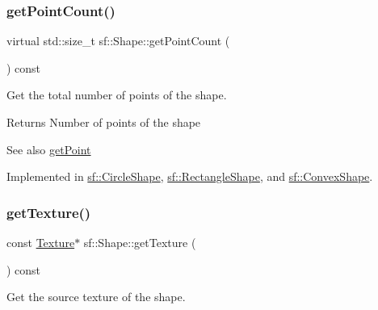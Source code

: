 \mbox{\label{classsf_1_1_shape_af988dd61a29803fc04d02198e44b5643}} 
\subsubsection{\texorpdfstring{get\+Point\+Count()}{getPointCount()}}
{\footnotesize\ttfamily virtual std\+::size\+\_\+t sf\+::\+Shape\+::get\+Point\+Count (\begin{DoxyParamCaption}{ }\end{DoxyParamCaption}) const\hspace{0.3cm}{\ttfamily [pure virtual]}}



Get the total number of points of the shape. 

\begin{DoxyReturn}{Returns}
Number of points of the shape
\end{DoxyReturn}
\begin{DoxySeeAlso}{See also}
\hyperlink{classsf_1_1_shape_a40e5d83713eb9f0c999944cf96458085}{get\+Point} 
\end{DoxySeeAlso}


Implemented in \hyperlink{classsf_1_1_circle_shape_a014d29ec11e8afa4dce50e7047d99601}{sf\+::\+Circle\+Shape}, \hyperlink{classsf_1_1_rectangle_shape_adfb2f429e5720c9ccdb26d5996c3ae33}{sf\+::\+Rectangle\+Shape}, and \hyperlink{classsf_1_1_convex_shape_a0c54b8d48fe4e13414f6e667dbfc22a3}{sf\+::\+Convex\+Shape}.

\mbox{\label{classsf_1_1_shape_a06682d37fd38d8fad56afdd5228b6951}} 
\subsubsection{\texorpdfstring{get\+Texture()}{getTexture()}}
{\footnotesize\ttfamily const \hyperlink{classsf_1_1_texture}{Texture}$\ast$ sf\+::\+Shape\+::get\+Texture (\begin{DoxyParamCaption}{ }\end{DoxyParamCaption}) const}



Get the source texture of the shape. 

